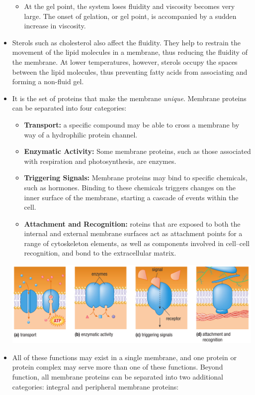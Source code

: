 \documentclass[letterpaper]{article}
\numberwithin{equation}{section}
\theoremstyle{classic}
\begin{document}
\begin{itemize}
\begin{itemize}
    \item At the gel point, the system loses fluidity and viscosity becomes very large. The onset of gelation, or gel point, is accompanied by a sudden increase in viscosity.
\end{itemize}
\item Sterols such as cholesterol also affect the fluidity. They help to restrain the movement of the lipid molecules in a membrane, thus reducing the fluidity of the membrane. At lower temperatures, however, sterols occupy the spaces between the lipid molecules, thus preventing fatty acids from associating and forming a non-fluid gel.
\item It is the set of proteins that make the membrane \textit{unique}. Membrane proteins can be separated into four categories:
\begin{itemize}
    \item \textbf{Transport:} a specific compound may be able to cross a membrane by way of a hydrophilic protein channel.
    \item \textbf{Enzymatic Activity:} Some membrane proteins, such as those associated with respiration and photosynthesis, are enzymes.
    \item \textbf{Triggering Signals:} Membrane proteins may bind to specific chemicals, such as hormones. Binding to these chemicals triggers changes on the inner surface of the membrane, starting a cascade of events within the cell.
    \item \textbf{Attachment and Recognition:} roteins that are exposed to both the internal and external membrane surfaces act as attachment points for a range of cytoskeleton elements, as well as components involved in cell–cell recognition, and bond to the extracellular matrix.
\end{itemize}
\begin{center}\includegraphics[width=0.9\linewidth]{A15.PNG}\end{center}
\item All of these functions may exist in a single membrane, and one protein or protein complex may serve more than one of these functions. Beyond function, all membrane proteins can be separated into two additional categories: integral and peripheral membrane proteins:

\end{itemize}
\end{document}
